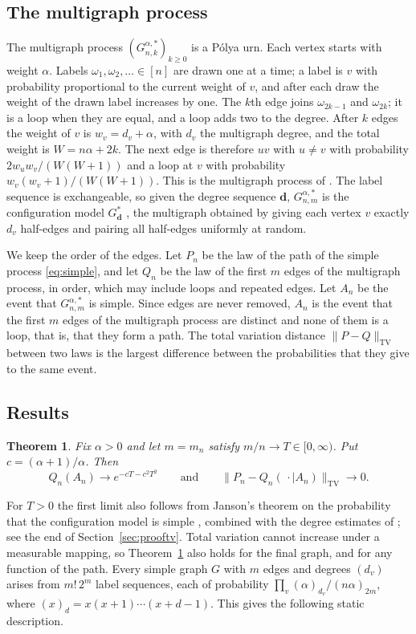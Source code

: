 \documentclass[11pt]{amsart}
\newtheorem{theorem}{Theorem}[section]
\theoremstyle{remark}
\numberwithin{equation}{section}
\newcommand{\TV}{\mathrm{TV}}
\begin{document}
\subsection{The multigraph process}\label{sec:intro-multi}
The multigraph process $(G^{\alpha,*}_{n,k})_{k\ge0}$ is a P\'olya urn. Each vertex starts with weight $\alpha$. Labels $\omega_1,\omega_2,\dots\in[n]$ are drawn one at a time; a label is $v$ with probability proportional to the current weight of $v$, and after each draw the weight of the drawn label increases by one. The $k$th edge joins $\omega_{2k-1}$ and $\omega_{2k}$; it is a loop when they are equal, and a loop adds two to the degree. After $k$ edges the weight of $v$ is $w_v=d_v+\alpha$, with $d_v$ the multigraph degree, and the total weight is $W=n\alpha+2k$. The next edge is therefore $uv$ with $u\ne v$ with probability $2w_uw_v/(W(W+1))$ and a loop at $v$ with probability $w_v(w_v+1)/(W(W+1))$. This is the multigraph process of \cite{JW21}. The label sequence is exchangeable, so given the degree sequence $\boldsymbol d$, $G^{\alpha,*}_{n,m}$ is the configuration model $G^*_{\boldsymbol d}$ \cite[Theorem~2.4]{JW21}, the multigraph obtained by giving each vertex $v$ exactly $d_v$ half-edges and pairing all half-edges uniformly at random.

We keep the order of the edges. Let $P_n$ be the law of the path of the simple process \eqref{eq:simple}, and let $Q_n$ be the law of the first $m$ edges of the multigraph process, in order, which may include loops and repeated edges. Let $A_n$ be the event that $G^{\alpha,*}_{n,m}$ is simple. Since edges are never removed, $A_n$ is the event that the first $m$ edges of the multigraph process are distinct and none of them is a loop, that is, that they form a path. The total variation distance $\|P-Q\|_{\TV}$ between two laws is the largest difference between the probabilities that they give to the same event.

\subsection{Results}\label{sec:results}

\begin{theorem}\label{thm:tv}
Fix $\alpha>0$ and let $m=m_n$ satisfy $m/n\to T\in[0,\infty)$. Put $c=(\alpha+1)/\alpha$. Then
\[
Q_n(A_n)\to e^{-cT-c^2T^2}\qquad\text{and}\qquad \bigl\|P_n-Q_n(\,\cdot\mid A_n)\bigr\|_{\TV}\to0 .
\]
\end{theorem}

For $T>0$ the first limit also follows from Janson's theorem on the probability that the configuration model is simple \cite[Corollary~1.5]{Ja09}, combined with the degree estimates of \cite[Theorem~2.5]{JW21}; see the end of Section~\ref{sec:prooftv}. Total variation cannot increase under a measurable mapping, so Theorem~\ref{thm:tv} also holds for the final graph, and for any function of the path. Every simple graph $G$ with $m$ edges and degrees $(d_v)$ arises from $m!\,2^m$ label sequences, each of probability $\prod_v(\alpha)_{d_v}/(n\alpha)_{2m}$, where $(x)_d=x(x+1)\cdots(x+d-1)$. This gives the following static description.
\end{document}
